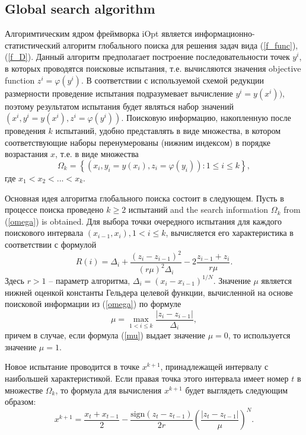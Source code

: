 \documentclass[preprint,12pt]{elsarticle}
\begin{document}
\subsection{Global search algorithm}
\label{sec_GSA}

Алгоримтическим ядром фреймворка iOpt является информационно-статистический алгоритм глобального поиска для решения задач вида (\ref{f_func}), (\ref{f_D}). 
Данный алгоритм предполагает построение последовательности точек $y^i$, в которых проводятся поисковые испытания, т.е. вычисляются значения objective function $z^i = \varphi(y^i)$. В соответствии с используемой схемой редукции размерности проведение испытания подразумевает вычисление $y^i=y(x^i))$, поэтому результатом испытания будет являться набор значений $(x^i, y^i=y(x^i), z^i = \varphi(y^i))$. 
Поисковую информацию, накопленную после проведения $k$ испытаний, удобно представлять в виде множества, в котором соответствующие наборы перенумерованы (нижним индексом) в порядке возрастания $x$, т.е. в виде множества 
\begin{equation}\label{omega}
\Omega_k = \left\{  (x_i, y_i=y(x_i), z_i = \varphi(y_i)): 1 \leq i \leq k  \right\},	
\end{equation}
где $x_1 < x_2 < ... < x_k$.



Основная идея алгоритма глобального поиска состоит в следующем.
Пусть в процессе поиска проведено $k \geq 2$ испытаний and the search information $\Omega_k$ from (\ref{omega}) is obtained.
Для выбора точки очередного испытания для каждого поискового интервала $(x_{i-1},x_i), 1<i\leq k$, вычисляется его характеристика в соответствии с формулой
\begin{equation}\label{R}
R(i) = \Delta_i + \frac{(z_i-z_{i-1})^2}{(r\mu)^2\Delta_i}-2\frac{z_{i-1}+z_i}{r\mu}.	
\end{equation}
Здесь $r>1$ -- параметр алгоритма, $\Delta_i=(x_i-x_{i-1})^{1/N}$. Значение $\mu$ является нижней оценкой константы Гельдера целевой функции, вычисленной на основе поисковой информации из (\ref{omega}) по формуле
\begin{equation}\label{mu}
\mu = \max_{1<i\leq k}\frac{\left|z_i-z_{i-1}\right|}{\Delta_i},
\end{equation}
причем в случае, если формула (\ref{mu}) выдает значение $\mu=0$, то используется значение $\mu=1$.

Новое испытание проводится в точке $x^{k+1}$, принадлежащей интервалу с наибольшей характеристикой. Если правая точка этого интервала имеет номер $t$ в множестве $\Omega_k$, то формула для вычисления $x^{k+1}$ будет выглядеть следующим образом:
\begin{equation}\label{xk1}
x^{k+1} = \frac{x_t+x_{t-1}}{2}- \frac{\mathrm{sign}(z_t-z_{t-1})}{2r} \left(\frac{\left|z_t-z_{t-1}\right|}{\mu}\right)^N.   
\end{equation}
\end{document}
